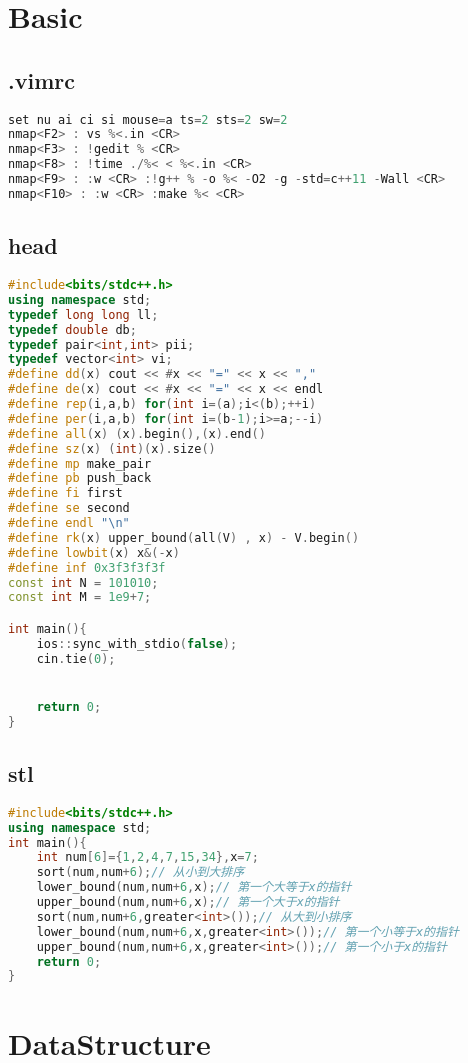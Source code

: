 \section{Basic}
\subsection{.vimrc}
\begin{lstlisting}[language=C++]
set nu ai ci si mouse=a ts=2 sts=2 sw=2
nmap<F2> : vs %<.in <CR>
nmap<F3> : !gedit % <CR>
nmap<F8> : !time ./%< < %<.in <CR>
nmap<F9> : :w <CR> :!g++ % -o %< -O2 -g -std=c++11 -Wall <CR>
nmap<F10> : :w <CR> :make %< <CR>
\end{lstlisting}
\subsection{head}
\begin{lstlisting}[language=C++]
#include<bits/stdc++.h>
using namespace std;
typedef long long ll;
typedef double db;
typedef pair<int,int> pii;
typedef vector<int> vi;
#define dd(x) cout << #x << "=" << x << ","
#define de(x) cout << #x << "=" << x << endl
#define rep(i,a,b) for(int i=(a);i<(b);++i)
#define per(i,a,b) for(int i=(b-1);i>=a;--i)
#define all(x) (x).begin(),(x).end()
#define sz(x) (int)(x).size()
#define mp make_pair
#define pb push_back
#define fi first
#define se second
#define endl "\n"
#define rk(x) upper_bound(all(V) , x) - V.begin()
#define lowbit(x) x&(-x)
#define inf 0x3f3f3f3f
const int N = 101010;
const int M = 1e9+7;

int main(){
	ios::sync_with_stdio(false);
	cin.tie(0);


	return 0;
}
\end{lstlisting}
\subsection{stl}
\begin{lstlisting}[language=C++]
#include<bits/stdc++.h>
using namespace std;
int main(){
	int num[6]={1,2,4,7,15,34},x=7;
	sort(num,num+6);// 从小到大排序 
	lower_bound(num,num+6,x);// 第一个大等于x的指针 
	upper_bound(num,num+6,x);// 第一个大于x的指针 
	sort(num,num+6,greater<int>());// 从大到小排序
	lower_bound(num,num+6,x,greater<int>());// 第一个小等于x的指针 
	upper_bound(num,num+6,x,greater<int>());// 第一个小于x的指针 
	return 0;	
}
\end{lstlisting}

\section{DataStructure}
